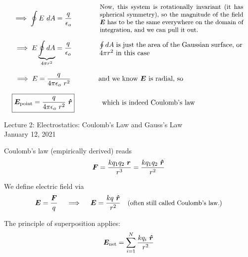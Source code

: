 \documentclass{article}
\begin{document}
\begin{equation*}
    \implies \oint E\ dA = \frac{q}{\epsilon_o} \qquad\qquad \parbox[c]{0.6\textwidth}{\small Now, this system is rotationally invariant (it has spherical symmetry), so the magnitude of the field $\bm{E}$ has to be the same everywhere on the domain of integration, and we can pull it out.}
\end{equation*}

\vspace{1em}

\begin{equation*}
    \implies E \underbrace{\oint dA}_{4\pi r^2} = \frac{q}{\epsilon_o} \qquad\qquad \parbox[c]{0.6\textwidth}{$\oint dA$ is just the area of the Gaussian surface, or $4\pi r^2$ in this case}
\end{equation*}

\begin{equation*}
    \implies E = \frac{q}{4\pi\epsilon_o\ r^2} \qquad\qquad \parbox[c]{0.6\textwidth}{and we know $\bm{E}$ is radial, so} 
\end{equation*}

\begin{equation*}
    \boxed{\bm{E}_{\text{point}} = \frac{q}{4\pi\epsilon_o\ r^2}\ \rhat} \qquad\qquad \parbox[c]{0.6\textwidth}{which is indeed Coulomb's law}
\end{equation*}

\newpage

\begin{center}
    {\Huge Lecture 2: Electrostatics: Coulomb's Law and Gauss's Law} \\[0.5cm]
    {\Large January 12, 2021}
\end{center}

\vspace{1cm}

Coulomb's law (empirically derived) reads
\begin{equation*}
    \bm{F} = \frac{k q_1 q_2\ \bm{r}}{r^3} = \frac{k q_1 q_2\ \bm{\hat{r}}}{r^2}
\end{equation*}

We define electric field via
\begin{equation*}
    \bm{E} = \frac{\bm{F}}{q} \quad \implies \quad \bm{E} = \frac{kq\ \bm{\hat{r}}}{r^2} \quad \text{\small (often still called Coulomb's law.)}
\end{equation*}

The principle of superposition applies:
\begin{equation*}
    \bm{E}_{\text{net}} = \sum\limits_{i = 1}^{N} \frac{k q_i\ \bm{\hat{r}}}{r^2}
\end{equation*}
\end{document}
